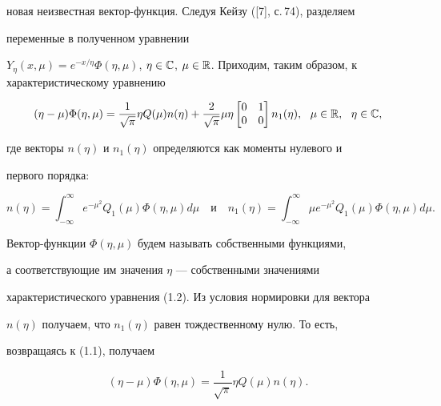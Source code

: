 новая неизвестная вектор-функция. Следуя Кейзу ([7], с.\,74), разделяем 


переменные в полученном уравнении 


$Y_\eta(x,\mu)=e^{-x/\eta}\Phi(\eta,\mu)$, $\eta\in\Bbb C$, $\mu\in\Bbb 


R$. Приходим, таким образом, к характеристическому уравнению 


\begin{equation} 


(\eta-\mu)\Phi(\eta,\mu)=\frac{1}{\sqrt{\pi}}\eta Q(\mu)n(\eta) 


+\frac{2}{\sqrt{\pi}}\mu\eta\begin{bmatrix} 


0 & 1 \\ 0 & 0 \end{bmatrix}n_1(\eta), 


\ \ \mu\in\Bbb R,\ \ \eta\in\Bbb C, 


\end{equation}  


где векторы $n(\eta)$ и $n_1(\eta)$ определяются как моменты нулевого и 


первого порядка: 


$$ 


n(\eta)=\int^\infty_{-\infty}e^{-\mu^2}Q_1(\mu) 


\Phi(\eta,\mu)d\mu\quad 


\text{и} 


\quad 


n_1(\eta)=\int^\infty_{-\infty}\mu e^{-\mu^2}Q_1(\mu) 


\Phi(\eta,\mu)d\mu. 


$$ 


Вектор-функции $\Phi(\eta,\mu)$ будем называть собственными функциями, 


а соответствующие им значения $\eta$ --- собственными значениями 


характеристического уравнения (1.2). Из условия нормировки для вектора 


$n(\eta)$ получаем, что $n_1(\eta)$ равен тождественному нулю. То есть, 


возвращаясь к (1.1), получаем 


\begin{equation} 


(\eta-\mu)\Phi(\eta,\mu)=\frac{1}{\sqrt{\pi}}\eta Q(\mu)n(\eta). 


\end{equation} 


